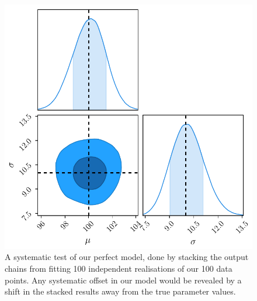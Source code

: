 \documentclass[a4paper,fleqn,usenatbib]{mnras}
\begin{document}
\begin{figure}
	\begin{center}
		\includegraphics[width=\columnwidth]{example/perfect.pdf}
	\end{center}
	\caption{A systematic test of our perfect model, done by stacking the output chains from fitting 100 independent realisations of our 100 data points. Any systematic offset in our model would be revealed by a shift in the stacked results away from the true parameter values.}
	\label{fig:perfect}
\end{figure}
\end{document}
